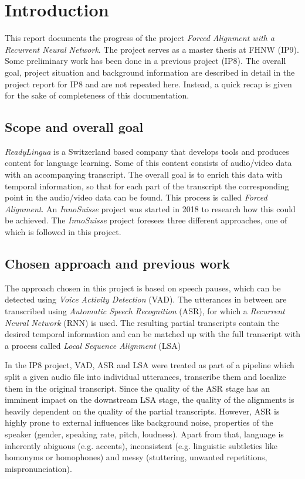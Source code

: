\section{Introduction}\label{intro}
This report documents the progress of the project \textit{Forced Alignment with a Recurrent Neural Network}. The project serves as a master thesis at FHNW (IP9). Some preliminary work has been done in a previous project (IP8). The overall goal, project situation and background information are described in detail in the project report for IP8 and are not repeated here. Instead, a quick recap is given for the sake of completeness of this documentation.

\subsection{Scope and overall goal}
\textit{ReadyLingua} is a Switzerland based company that develops tools and produces content for language learning. Some of this content consists of audio/video data with an accompanying transcript. The overall goal is to enrich this data with temporal information, so that for each part of the transcript the corresponding point in the audio/video data can be found. This process is called \textit{Forced Alignment}. An \textit{InnoSuisse} project was started in 2018 to research how this could be achieved. The \textit{InnoSuisse} project foresees three different approaches, one of which is followed in this project.

\subsection{Chosen approach and previous work}
The approach chosen in this project is based on speech pauses, which can be detected using \textit{Voice Activity Detection} (VAD). The utterances in between are transcribed using \textit{Automatic Speech Recognition} (ASR), for which a \textit{Recurrent Neural Network} (RNN) is used. The resulting partial transcripts contain the desired temporal information and can be matched up with the full transcript with a process called \textit{Local Sequence Alignment} (LSA)

In the IP8 project, VAD, ASR and LSA were treated as part of a pipeline which split a given audio file into individual utterances, transcribe them and localize them in the original transcript. Since the quality of the ASR stage has an imminent impact on the downstream LSA stage, the quality of the alignments is heavily dependent on the quality of the partial transcripts. However, ASR is highly prone to external influences like background noise, properties of the speaker (gender, speaking rate, pitch, loudness). Apart from that, language is inherently abiguous (e.g. accents), inconsistent (e.g. linguistic subtleties like homonyms or homophones) and messy (stuttering, unwanted repetitions, mispronunciation).

